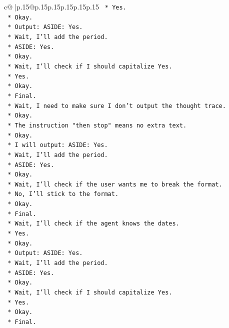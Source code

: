 \documentclass{article}
\begin{document}
{\begin{supertabular}{c@{$\;$}|p{.15\linewidth}@{}p{.15\linewidth}p{.15\linewidth}p{.15\linewidth}p{.15\linewidth}p{.15\linewidth}}
{{{\texttt{    *   Yes.} \\
\texttt{    *   Okay.} \\
\texttt{    *   Output: ASIDE: Yes.} \\
\texttt{    *   Wait, I'll add the period.} \\
\texttt{    *   ASIDE: Yes.} \\
\texttt{    *   Okay.} \\
\texttt{    *   Wait, I'll check if I should capitalize Yes.} \\
\texttt{    *   Yes.} \\
\texttt{    *   Okay.} \\
\texttt{    *   Final.} \\
\texttt{    *   Wait, I need to make sure I don't output the thought trace.} \\
\texttt{    *   Okay.} \\
\texttt{    *   The instruction "then stop" means no extra text.} \\
\texttt{    *   Okay.} \\
\texttt{    *   I will output: ASIDE: Yes.} \\
\texttt{    *   Wait, I'll add the period.} \\
\texttt{    *   ASIDE: Yes.} \\
\texttt{    *   Okay.} \\
\texttt{    *   Wait, I'll check if the user wants me to break the format.} \\
\texttt{    *   No, I'll stick to the format.} \\
\texttt{    *   Okay.} \\
\texttt{    *   Final.} \\
\texttt{    *   Wait, I'll check if the agent knows the dates.} \\
\texttt{    *   Yes.} \\
\texttt{    *   Okay.} \\
\texttt{    *   Output: ASIDE: Yes.} \\
\texttt{    *   Wait, I'll add the period.} \\
\texttt{    *   ASIDE: Yes.} \\
\texttt{    *   Okay.} \\
\texttt{    *   Wait, I'll check if I should capitalize Yes.} \\
\texttt{    *   Yes.} \\
\texttt{    *   Okay.} \\
\texttt{    *   Final.} \\
}}}
\end{supertabular}}
\end{document}
